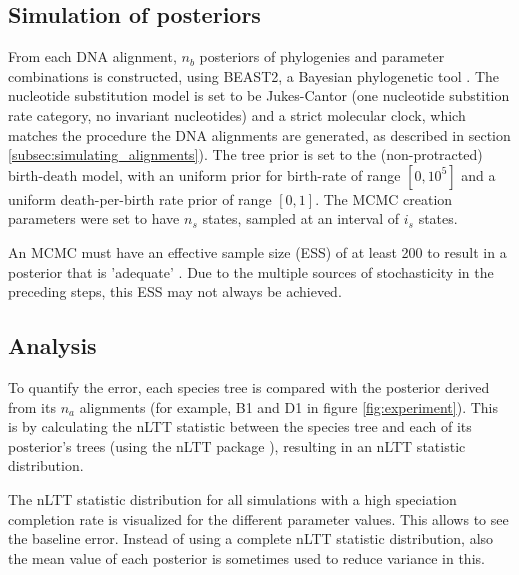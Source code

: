 \documentclass{article}
\begin{document}
\subsection{Simulation of posteriors}

From each DNA alignment, $n_b$ posteriors of phylogenies and parameter combinations 
is constructed, using BEAST2, a Bayesian phylogenetic tool \cite{bouckaert2014beast}.
The nucleotide substitution model is set to 
be Jukes-Cantor (one nucleotide substition rate category, no invariant nucleotides) 
and a strict molecular clock, which matches the procedure the DNA alignments are generated, 
as described in section \ref{subsec:simulating_alignments}).
The tree prior is set to the (non-protracted) birth-death model, 
with an uniform prior for birth-rate of range $[0, 10^5]$ and 
a uniform death-per-birth rate prior of range $[0, 1]$. 
The MCMC creation parameters were set to have $n_s$ states, sampled at an interval of $i_s$ states.

An MCMC must have an effective sample size (ESS) of at least 200 to result in a 
posterior that is 'adequate' \cite{drummond2015bayesian}. Due to the multiple 
sources of stochasticity in the preceding steps, this ESS may not always be achieved.

\subsection{Analysis}

To quantify the error, each species tree is compared with the posterior derived
from its $n_a$ alignments (for example, B1 and D1 in figure \ref{fig:experiment}).
This is by calculating the nLTT statistic \cite{janzen2015approximate}
between the species tree and each of its posterior's trees (using 
the nLTT package \cite{nLTT}), resulting in an nLTT statistic distribution. 


The nLTT statistic distribution for all simulations with a high speciation 
completion rate is visualized for the different parameter values. This allows
to see the baseline error. Instead of using a complete
nLTT statistic distribution, also the mean value of each posterior is 
sometimes used to reduce variance in this.
\end{document}
